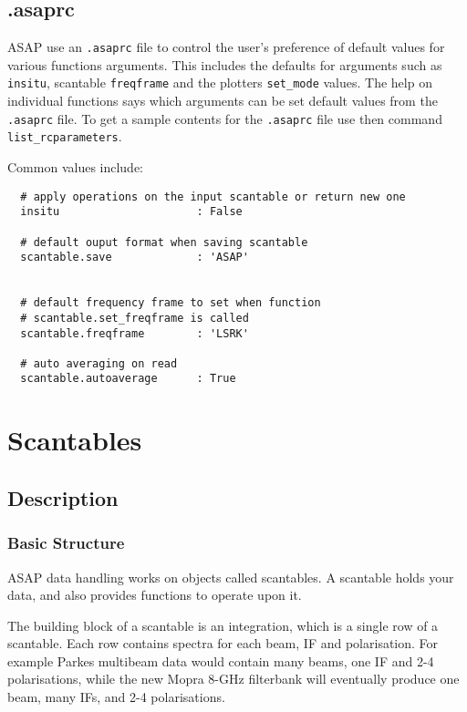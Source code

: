 \documentclass[11pt]{article}
\newcommand{\cmd}[1]{{\tt #1}}
\begin{document}
\subsection{.asaprc}

ASAP use an \cmd{.asaprc} file to control the user's preference of
default values for various functions arguments. This includes the
defaults for arguments such as \cmd{insitu}, scantable \cmd{freqframe}
and the plotters \cmd{set\_mode} values. The help on individual
functions says which arguments can be set default values from the
\cmd{.asaprc} file. To get a sample contents for the \cmd{.asaprc}
file use then command \cmd{list\_rcparameters}.

Common values include:
\begin{verbatim}
  # apply operations on the input scantable or return new one
  insitu                     : False

  # default ouput format when saving scantable
  scantable.save             : 'ASAP'


  # default frequency frame to set when function
  # scantable.set_freqframe is called
  scantable.freqframe        : 'LSRK'

  # auto averaging on read
  scantable.autoaverage      : True
\end{verbatim}

\section{Scantables}

\subsection {Description}

\subsubsection {Basic Structure}

ASAP data handling works on objects called scantables.  A scantable
holds your data, and also provides functions to operate
upon it.

The building block of a scantable is an integration, which is a single
row of a scantable. Each row contains spectra for each beam, IF and
polarisation. For example Parkes multibeam data would contain many
beams, one IF and 2-4 polarisations, while the new Mopra 8-GHz
filterbank will eventually produce one beam, many IFs, and 2-4
polarisations.
\end{document}
